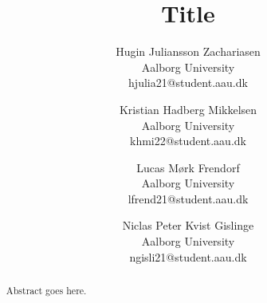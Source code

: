 \documentclass[twocolumn]{article}
\begin{document}
\title{Title}
\author{
	Hugin Juliansson Zachariasen \\ Aalborg University \\ hjulia21@student.aau.dk
	\and
	Kristian Hadberg Mikkelsen \\ Aalborg University \\ khmi22@student.aau.dk
	\and
	Lucas Mørk Frendorf \\ Aalborg University \\ lfrend21@student.aau.dk
	\and
	Niclas Peter Kvist Gislinge \\ Aalborg University \\ ngisli21@student.aau.dk
}
\maketitle

\begin{abstract}
	Abstract goes here.
\end{abstract}







~\cite{articletemplate}

\printbibliography[heading=bibintoc, title=Bibliography]
\label{bib:mybiblio}
\end{document}
